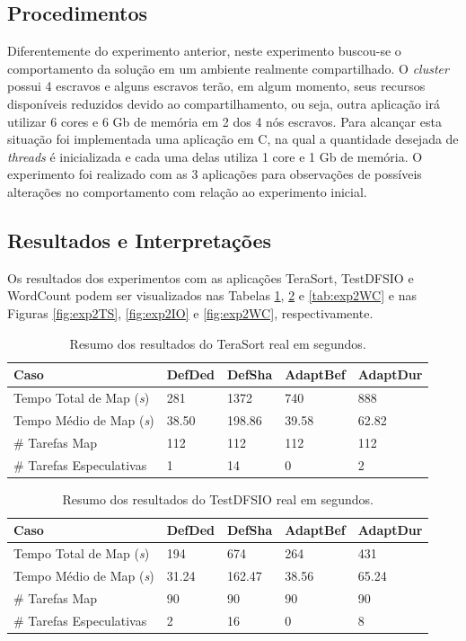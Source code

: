 \subsection{Procedimentos}
Diferentemente do experimento anterior, neste experimento buscou-se o comportamento da solução em um ambiente realmente compartilhado. O \textit{cluster} possui 4 escravos e alguns escravos terão, em algum momento, seus recursos disponíveis reduzidos devido ao compartilhamento, ou seja, outra aplicação irá utilizar 6 cores e 6 Gb de memória em 2 dos 4 nós escravos. Para alcançar esta situação foi implementada uma aplicação em C, na qual a quantidade desejada de \textit{threads} é inicializada e cada uma delas utiliza 1 core e 1 Gb de memória. O experimento foi realizado com as 3 aplicações para observações de possíveis alterações no comportamento com relação ao experimento inicial.

\subsection{Resultados e Interpretações}
Os resultados dos experimentos com as aplicações TeraSort, TestDFSIO e WordCount podem ser visualizados nas Tabelas \ref{tab:exp2TS}, \ref{tab:exp2IO} e \ref{tab:exp2WC} e nas Figuras \ref{fig:exp2TS}, \ref{fig:exp2IO} e \ref{fig:exp2WC}, respectivamente.

\begin{table}[!ht]
	\caption{Resumo dos resultados do TeraSort real em segundos.} \label{tab:exp2TS}
	\begin{tabular*}{\hsize}{lllll}
		\textbf{Caso} & \textbf{DefDed} & \textbf{DefSha} & \textbf{AdaptBef} & \textbf{AdaptDur}\\
		\hline
		Tempo Total de Map ({\it{s}}) & 281 & 1372 & 740 & 888 \\
		Tempo Médio de Map ({\it{s}}) & 38.50 & 198.86 & 39.58 & 62.82 \\
		\# Tarefas Map & 112 & 112 & 112 & 112 \\
		\# Tarefas Especulativas & 1 & 14 & 0 & 2 \\
	\end{tabular*}
\end{table}

\begin{table}[!ht]
	\caption{Resumo dos resultados do TestDFSIO real em segundos.} \label{tab:exp2IO}
	\begin{tabular*}{\hsize}{lllll}
		\textbf{Caso} & \textbf{DefDed} & \textbf{DefSha} & \textbf{AdaptBef} & \textbf{AdaptDur}\\
		\hline
		Tempo Total de Map ({\it{s}}) & 194 & 674 & 264 & 431 \\
		Tempo Médio de Map ({\it{s}}) & 31.24 & 162.47 & 38.56 &  65.24 \\
		\# Tarefas Map & 90 & 90 & 90 & 90 \\
		\# Tarefas Especulativas & 2 & 16 & 0 & 8 \\
	\end{tabular*}
\end{table}


